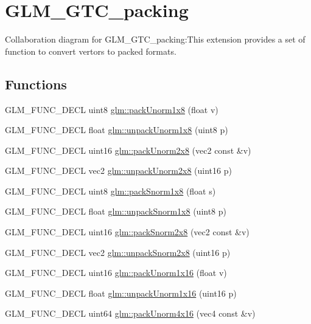 \hypertarget{group__gtc__packing}{
\section{GLM\_\-GTC\_\-packing}
\label{group__gtc__packing}
}


Collaboration diagram for GLM\_\-GTC\_\-packing:This extension provides a set of function to convert vertors to packed formats.  
\subsection*{Functions}
\begin{CompactItemize}
\item 
GLM\_\-FUNC\_\-DECL uint8 \hyperlink{group__gtc__packing_g2f9963e5d762b10085b280d3662017ba}{glm::packUnorm1x8} (float v)
\item 
GLM\_\-FUNC\_\-DECL float \hyperlink{group__gtc__packing_g32f3f2642df2ea87449d59fb614a8305}{glm::unpackUnorm1x8} (uint8 p)
\item 
GLM\_\-FUNC\_\-DECL uint16 \hyperlink{group__gtc__packing_g833288fc0d4a79f19d0db75a6843bfe6}{glm::packUnorm2x8} (vec2 const \&v)
\item 
GLM\_\-FUNC\_\-DECL vec2 \hyperlink{group__gtc__packing_g96ce0c24339ee676e28a027fffd1edf6}{glm::unpackUnorm2x8} (uint16 p)
\item 
GLM\_\-FUNC\_\-DECL uint8 \hyperlink{group__gtc__packing_g26b6cd7a35c46c4b6a342f3b97b47423}{glm::packSnorm1x8} (float s)
\item 
GLM\_\-FUNC\_\-DECL float \hyperlink{group__gtc__packing_g6f2bebf536fbf7c8b97d4b306bb3354e}{glm::unpackSnorm1x8} (uint8 p)
\item 
GLM\_\-FUNC\_\-DECL uint16 \hyperlink{group__gtc__packing_g05d08a82923166ec7cd5d0e6154c9953}{glm::packSnorm2x8} (vec2 const \&v)
\item 
GLM\_\-FUNC\_\-DECL vec2 \hyperlink{group__gtc__packing_g27f30f0281b88e152b0895f5e2ead878}{glm::unpackSnorm2x8} (uint16 p)
\item 
GLM\_\-FUNC\_\-DECL uint16 \hyperlink{group__gtc__packing_g60c7d915f5653559ae02c2f79a8c5c1d}{glm::packUnorm1x16} (float v)
\item 
GLM\_\-FUNC\_\-DECL float \hyperlink{group__gtc__packing_g7770e3ade4f4764cc1b2eb42ac4ec188}{glm::unpackUnorm1x16} (uint16 p)
\item 
GLM\_\-FUNC\_\-DECL uint64 \hyperlink{group__gtc__packing_gc561f06c908b7302537a8ef29fcb409e}{glm::packUnorm4x16} (vec4 const \&v)

\end{CompactItemize}
